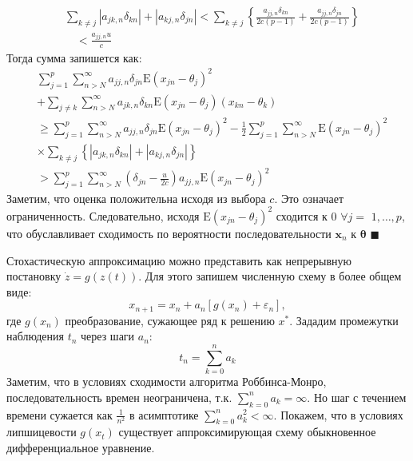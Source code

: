 \begin{equation}
    \begin{aligned}
        & \sum_{k \neq j}\left|a_{j k, n} \delta_{k n}\right|+\left|a_{k j, n} \delta_{j n}\right|<\sum_{k \neq j}\left\{\frac{a_{j j, n} \delta_{k n}}{2 c(p-1)}+\frac{a_{j j, n} \delta_{j n}}{2 c(p-1)}\right\} \\
        & \quad<\frac{a_{j j, n} u}{c}
    \end{aligned}  
\end{equation}
Тогда сумма запишется как:
\begin{equation}
    \begin{aligned}
        & \sum_{j=1}^{p} \sum_{n>N}^{\infty} a_{j j, n} \delta_{j n} \mathrm{E}\left(x_{j n}-\theta_{j}\right)^{2} \\
        & +\sum_{j \neq k} \sum_{n>N}^{\infty} a_{j k, n} \delta_{k n} \mathrm{E}\left(x_{j n}-\theta_{j}\right)\left(x_{k n}-\theta_{k}\right) \\
        &  \geq \sum_{j=1}^{p} \sum_{n>N}^{\infty} a_{j j, n} \delta_{j n} \mathrm{E}\left(x_{j n}-\theta_{j}\right)^{2}-\frac{1}{2} \sum_{j=1}^{p} \sum_{n>N}^{\infty} \mathrm{E}\left(x_{j n}-\theta_{j}\right)^{2} \\
        &  \times \sum_{k \neq j}\left\{\left|a_{j k, n} \delta_{k n}\right|+\left|a_{k j, n} \delta_{j n}\right|\right\} \\
        & >\sum_{j=1}^{p} \sum_{n>N}^{\infty}\left(\delta_{j n}-\frac{u}{2 c}\right) a_{j j, n} \mathrm{E}\left(x_{j n}-\theta_{j}\right)^{2}
    \end{aligned}
\end{equation}
Заметим, что оценка положительна исходя из выбора $c$. Это означает ограниченность.
Следовательно, исходя $\mathrm{E}\left(x_{j n}-\theta_{j}\right)^{2}$ сходится к 0 $\forall j=$ $1, \ldots, p$,
что обуславливает сходимость по вероятности последовательности $\mathbf{x}_{n}$ к $\boldsymbol{\theta}$
$\blacksquare$

Стохастическую аппроксимацию можно представить
как непрерывную постановку $\dot{z} = g(z(t))$. Для этого запишем численную схему в более общем виде:
\begin{equation}
    x_{n+1} = x_n + a_n \left[g(x_n) + \varepsilon_n \right],
\end{equation}
где $g(x_n)$ преобразование, сужающее ряд к решению $x^*$. Зададим промежутки наблюдения $t_n$ через шаги $a_n$:
\begin{equation}
    t_n = \sum_{k=0}^n a_k 
\end{equation}
Заметим, что в условиях сходимости алгоритма Роббинса-Монро, последовательность времен неограничена, 
т.к. $\sum_{k=0}^n a_k =\infty$.
Но шаг с течением времени сужается как $\frac{1}{n^2}$ в асимптотике $\sum_{k=0}^n a^2_k < \infty$. 
Покажем, что в условиях липшицевости $g(x_t)$ существует аппроксимирующая
схему обыкновенное дифференциальное уравнение.

